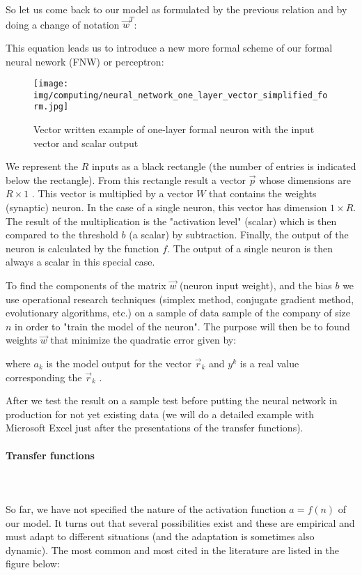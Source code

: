 	So let us come back to our model as formulated by the previous relation and by doing a change of notation $\vec{w}^T$:
	
	This equation leads us to introduce a new more formal scheme of our formal neural nework (FNW) or perceptron:
	\begin{figure}[H]
		\centering
		\texttt{[image: img/computing/neural\_network\_one\_layer\_vector\_simplified\_form.jpg]}
		\caption{Vector written example of one-layer formal neuron with the input vector and scalar output}
	\end{figure}
	We represent the $R$ inputs as a black rectangle (the number of entries is indicated below the rectangle). From this rectangle result a vector $\vec{p}$ whose dimensions are $R\times 1$ . This vector is multiplied by a vector $W$ that contains the weights (synaptic) neuron. In the case of a single neuron, this vector has dimension $1\times R$. The result of the multiplication is the "activation level" (scalar) which is then compared to the threshold $b$ (a scalar) by subtraction. Finally, the output of the neuron is calculated by the function $f$. The output of a single neuron is then always a scalar in this special case.

	To find the components of the matrix $\vec{w}$ (neuron input weight), and the bias $b$ we use operational research techniques (simplex method, conjugate gradient method, evolutionary algorithms, etc.) on a sample of data sample of the company of size $n$ in order to "train the model of the neuron". The purpose will then be to found weights $\vec{w}$ that minimize the quadratic error given by:
	
	where $a_k$ is the model output for the vector $\vec{r}_k$ and $y^k$ is a real value corresponding the $\vec{r}_k$ .
	
	After we test the result on a sample test before  putting the neural network in production for not yet existing data (we will do a detailed example with Microsoft Excel just after the presentations of the transfer functions).
		
	\pagebreak
	\paragraph{Transfer functions}\mbox{}\\\\
	So far, we have not specified the nature of the activation function $a=f(n)$ of our model. It turns out that several possibilities exist and these are empirical and must adapt to different situations (and the adaptation is sometimes also dynamic). The most common and most cited in the literature are listed in the figure below:
	
